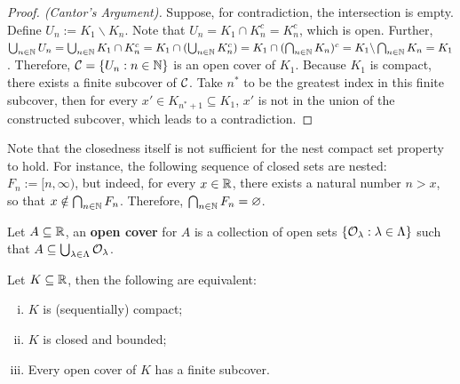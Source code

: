 \documentclass[11pt]{article}
\begin{document}
	\begin{proof}[Proof. (Cantor's Argument)]
		Suppose, for contradiction, the intersection is empty. Define $U_n := K_1 \backslash K_n$. Note that $U_n = K_1 \cap K_n^c = K_n^c$, which is open. Further, $\bigcup_{n \in \mathbb{N}} U_n = \bigcup_{n \in \mathbb{N}} K_1 \cap K_n^c = K_1 \cap (\bigcup_{n \in \mathbb{N}}K_n^c) = K_1 \cap (\bigcap_{n \in \mathbb{N}}K_n)^c = K_1 \backslash \bigcap_{n \in \mathbb{N}}K_n = K_1$. Therefore, $\mathcal{{C}} = \{U_n: n \in \mathbb{N}\}$ is an open cover of $K_1$. Because $K_1$ is compact, there exists a finite subcover of $\mathcal{{C}}$. Take $n^*$ to be the greatest index in this finite subcover, then for every $x' \in K_{n^*+1} \subseteq K_1$, $x'$ is not in the union of the constructed subcover, which leads to a contradiction.
	\end{proof}
	
	\begin{example}
		Note that the closedness itself is not sufficient for the nest compact set property to hold. For instance, the following sequence of closed sets are nested: $F_n := [n, \infty)$, but indeed, for every $x \in \mathbb{R}$, there exists a natural number $n > x$, so that $x \notin \bigcap_{n \in \mathbb{N}} F_n$. Therefore, $\bigcap_{n \in \mathbb{N}} F_n = \varnothing$.
	\end{example}
	
	\begin{definition}
		Let $A \subseteq \mathbb{R}$, an \textbf{open cover} for $A$ is a collection of open sets $\{\mathcal{{O}}_\lambda: \lambda \in \Lambda\}$ such that $A \subseteq \bigcup_{\lambda \in \Lambda} \mathcal{{O}}_\lambda$.
	\end{definition}
	
	\begin{theorem}
		Let $K \subseteq \mathbb{R}$, then the following are equivalent:
		\begin{enumerate}[(i)]
			\item $K$ is (sequentially) compact;
			\item $K$ is closed and bounded;
			\item Every open cover of $K$ has a finite subcover.
		\end{enumerate}
	\end{theorem}
	
\end{document}
